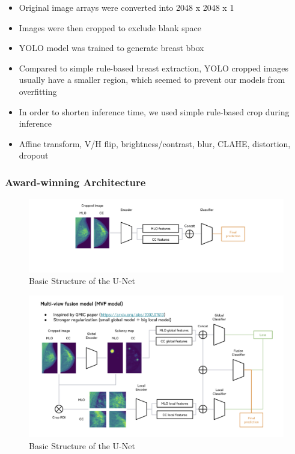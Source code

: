 \documentclass{article}
\begin{document}
\begin{itemize}
    \item Original image arrays were converted into 2048 x 2048 x 1
    \item Images were then cropped to exclude blank space
    \item YOLO model was trained to generate breast bbox
    \item Compared to simple rule-based breast extraction, YOLO cropped images usually have a smaller region, which seemed to prevent our models from overfitting
    \item In order to shorten inference time, we used simple rule-based crop during inference
    \item Affine transform, V/H flip, brightness/contrast, blur, CLAHE, distortion, dropout
\end{itemize}

\subsubsection{Award-winning Architecture}
\begin{figure}[htp]
    \centering
    \includegraphics[scale = 0.6]{Figures/Award-winning Architecture 1.png}
   \caption{Basic Structure of the U-Net}
\end{figure}

\begin{figure}[htp]
    \centering
    \includegraphics[scale = 0.6]{Figures/Award-winning Architecture 2.png}
   \caption{Basic Structure of the U-Net}
\end{figure}
\end{document}
